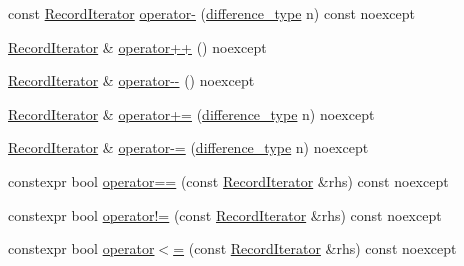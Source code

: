 \begin{DoxyCompactItemize}
\item 
const \mbox{\hyperlink{classmage_1_1_component_manager_1_1_record_iterator}{Record\+Iterator}} \mbox{\hyperlink{classmage_1_1_component_manager_1_1_record_iterator_ae69d320a9b9cb2f6635e2c0a91ec3fc4}{operator-\/}} (\mbox{\hyperlink{classmage_1_1_component_manager_1_1_record_iterator_a3ca7b08fca57e3f69c5de58be46edd70}{difference\+\_\+type}} n) const noexcept
\item 
\mbox{\hyperlink{classmage_1_1_component_manager_1_1_record_iterator}{Record\+Iterator}} \& \mbox{\hyperlink{classmage_1_1_component_manager_1_1_record_iterator_a1be474812ab8f6b04232904faa263cff}{operator++}} () noexcept
\item 
\mbox{\hyperlink{classmage_1_1_component_manager_1_1_record_iterator}{Record\+Iterator}} \& \mbox{\hyperlink{classmage_1_1_component_manager_1_1_record_iterator_a62c8570d95de19efcbdc1339446000c9}{operator-\/-\/}} () noexcept
\item 
\mbox{\hyperlink{classmage_1_1_component_manager_1_1_record_iterator}{Record\+Iterator}} \& \mbox{\hyperlink{classmage_1_1_component_manager_1_1_record_iterator_a48d9977a5e4d8fbfec07223cb7cdb6f1}{operator+=}} (\mbox{\hyperlink{classmage_1_1_component_manager_1_1_record_iterator_a3ca7b08fca57e3f69c5de58be46edd70}{difference\+\_\+type}} n) noexcept
\item 
\mbox{\hyperlink{classmage_1_1_component_manager_1_1_record_iterator}{Record\+Iterator}} \& \mbox{\hyperlink{classmage_1_1_component_manager_1_1_record_iterator_a9eaca4e33e06e584138fc906aa780a3a}{operator-\/=}} (\mbox{\hyperlink{classmage_1_1_component_manager_1_1_record_iterator_a3ca7b08fca57e3f69c5de58be46edd70}{difference\+\_\+type}} n) noexcept
\item 
constexpr bool \mbox{\hyperlink{classmage_1_1_component_manager_1_1_record_iterator_ae7b4d124b4c0f51163167e994c855ad4}{operator==}} (const \mbox{\hyperlink{classmage_1_1_component_manager_1_1_record_iterator}{Record\+Iterator}} \&rhs) const noexcept
\item 
constexpr bool \mbox{\hyperlink{classmage_1_1_component_manager_1_1_record_iterator_ad3c860ddbe7d169460d99a532682c4ce}{operator!=}} (const \mbox{\hyperlink{classmage_1_1_component_manager_1_1_record_iterator}{Record\+Iterator}} \&rhs) const noexcept
\item 
constexpr bool \mbox{\hyperlink{classmage_1_1_component_manager_1_1_record_iterator_a17ee6f33ecaa0afff95f941f916e5cff}{operator$<$=}} (const \mbox{\hyperlink{classmage_1_1_component_manager_1_1_record_iterator}{Record\+Iterator}} \&rhs) const noexcept

\end{DoxyCompactItemize}
